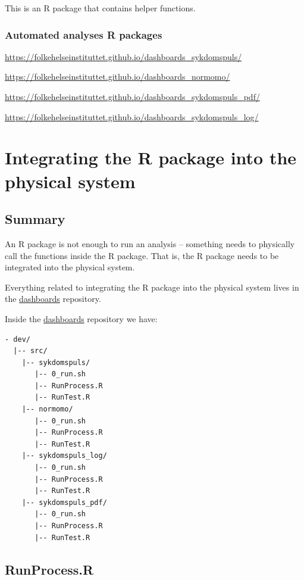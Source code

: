 \documentclass[12pt,]{article}
\begin{document}
This is an R package that contains helper functions.

\subsubsection{Automated analyses R
packages}\label{automated-analyses-r-packages}

\url{https://folkehelseinstituttet.github.io/dashboards_sykdomspuls/}

\url{https://folkehelseinstituttet.github.io/dashboards_normomo/}

\url{https://folkehelseinstituttet.github.io/dashboards_sykdomspuls_pdf/}

\url{https://folkehelseinstituttet.github.io/dashboards_sykdomspuls_log/}

\section{Integrating the R package into the physical
system}\label{integrating-the-r-package-into-the-physical-system}

\subsection{Summary}\label{summary}

An R package is not enough to run an analysis -- something needs to
physically call the functions inside the R package. That is, the R
package needs to be integrated into the physical system.

Everything related to integrating the R package into the physical system
lives in the
\href{https://github.com/folkehelseinstituttet/dashboards/}{dashboards}
repository.

Inside the
\href{https://github.com/folkehelseinstituttet/dashboards/}{dashboards}
repository we have:

\begin{verbatim}
- dev/
  |-- src/
    |-- sykdomspuls/
       |-- 0_run.sh
       |-- RunProcess.R
       |-- RunTest.R
    |-- normomo/
       |-- 0_run.sh
       |-- RunProcess.R
       |-- RunTest.R
    |-- sykdomspuls_log/
       |-- 0_run.sh
       |-- RunProcess.R
       |-- RunTest.R
    |-- sykdomspuls_pdf/
       |-- 0_run.sh
       |-- RunProcess.R
       |-- RunTest.R
\end{verbatim}

\subsection{RunProcess.R}\label{runprocess.r}
\end{document}
